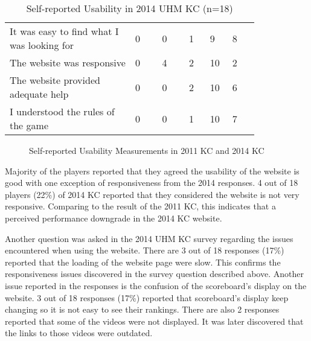 \begin{table}[ht!]
  \centering
  \begin{tabular} {|P{0.42\linewidth}|P{0.09\linewidth}|p{0.09\linewidth}|p{0.075\linewidth}|p{0.06\linewidth}|P{0.09\linewidth}|}
    \hline
    \centering {} &  &  &  &  & \\
    \hline
It was easy to find what I was looking for & 0 & 0 & 1 & 9 & 8\\
    \hline
The website was responsive & 0 & 4 & 2 & 10 & 2 \\
    \hline
The website provided adequate help & 0 & 0 & 2 & 10 & 6 \\
    \hline
I understood the rules of the game & 0 & 0 & 1 & 10 & 7 \\
    \hline 
  \end{tabular}
  \caption{Self-reported Usability in 2014 UHM KC (n=18)}
  \label{table:self-report-usability-2014}
\end{table}

\begin{figure}[ht!]
	\centering
		\caption{Self-reported Usability Measurements in 2011 KC and 2014 KC}
		\label{fig:self-report-usability-2011-2014}
\end{figure}

Majority of the players reported that they agreed the usability of the website is good with one exception of responsiveness from the 2014 responses. 4 out of 18 players (22\%) of 2014 KC reported that they considered the website is not very responsive. Comparing to the result of the 2011 KC, this indicates that a perceived performance downgrade in the 2014 KC website.

Another question was asked in the 2014 UHM KC survey regarding the issues encountered when using the website. There are 3 out of 18 responses (17\%) reported that the loading of the website page were slow. This confirms the responsiveness issues discovered in the survey question described above. Another issue reported in the responses is the confusion of the scoreboard's display on the website. 3 out of 18 responses (17\%) reported that scoreboard's display keep changing so it is not easy to see their rankings. There are also 2 responses reported that some of the videos were not displayed. It was later discovered that the links to those videos were outdated.

